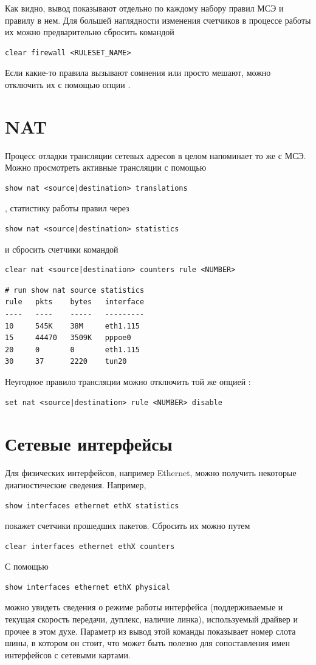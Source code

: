 \documentclass[a4paper,12pt, twoside, russian]{report}
\begin{document}
Как видно, вывод показывают отдельно по каждому набору правил МСЭ и правилу в нем. Для большей 
наглядности изменения счетчиков в процессе работы их можно предварительно сбросить командой 
\begin{verbatim}clear firewall <RULESET_NAME>\end{verbatim}

Если какие-то правила вызывают сомнения или просто мешают, можно отключить их с помощью опции
.

\section{NAT}

Процесс отладки трансляции сетевых адресов в целом напоминает то же с МСЭ. Можно просмотреть активные 
трансляции с помощью \begin{verbatim}show nat <source|destination> translations\end{verbatim}, статистику работы правил через 
\begin{verbatim}show nat <source|destination> statistics\end{verbatim} и сбросить счетчики командой 
\begin{verbatim}clear nat <source|destination> counters rule <NUMBER>\end{verbatim}
\begin{verbatim}
# run show nat source statistics 
rule   pkts    bytes   interface   
----   ----    -----   ---------   
10     545K    38M     eth1.115    
15     44470   3509K   pppoe0      
20     0       0       eth1.115    
30     37      2220    tun20       
\end{verbatim}

Неугодное правило трансляции можно отключить той же опцией : 
\begin{verbatim}set nat <source|destination> rule <NUMBER> disable\end{verbatim}

\section{Сетевые интерфейсы}

Для физических интерфейсов, например Ethernet, можно получить некоторые диагностические сведения.
Например, \begin{verbatim}show interfaces ethernet ethX statistics\end{verbatim}
покажет счетчики прошедших пакетов. Сбросить их можно путем 
\begin{verbatim}clear interfaces ethernet ethX counters\end{verbatim}
С помощью \begin{verbatim}show interfaces ethernet ethX physical\end{verbatim}
можно увидеть сведения о режиме работы интерфейса (поддерживаемые и текущая скорость передачи, дуплекс, 
наличие линка), используемый драйвер и прочее в этом духе. Параметр  из вывод этой команды 
показывает номер слота шины, в котором он стоит, что может быть полезно для сопоставления имен интерфейсов
с сетевыми картами.
\end{document}
